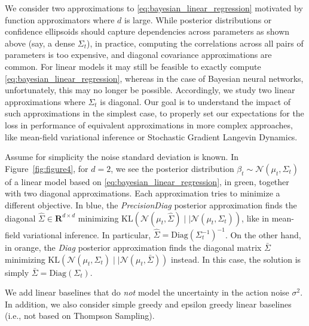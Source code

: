 \documentclass{article} \usepackage{iclr2018_conference,times}
\begin{document}
We consider two approximations to \eqref{eq:bayesian_linear_regression} motivated by function approximators where $d$ is large. While posterior distributions or confidence ellipsoids should capture dependencies across parameters as shown above (say, a dense $\Sigma_t$), in practice, computing the correlations across all pairs of parameters is too expensive, and diagonal covariance approximations are common.
For linear models it may still be feasible to exactly compute \eqref{eq:bayesian_linear_regression}, whereas in the case of Bayesian neural networks, unfortunately, this may no longer be possible.
Accordingly, we study two linear approximations where $\Sigma_t$ is diagonal. 
Our goal is to understand the impact of such approximations in the simplest case, to properly set our expectations for the loss in performance of equivalent approximations in more complex approaches, like mean-field variational inference or Stochastic Gradient Langevin Dynamics.

Assume for simplicity the noise standard deviation is known.
In Figure~\ref{fig:figure4}, for $d=2$, we see the posterior distribution $\beta_t \sim \mathcal{N}(\mu_t, \Sigma_t)$ of a linear model based on \eqref{eq:bayesian_linear_regression}, in green, together with two diagonal approximations.
Each approximation tries to minimize a different objective.
In blue, the \emph{PrecisionDiag} posterior approximation finds the diagonal $\hat{\Sigma} \in \mathbf{R}^{d \times d}$ minimizing $\text{KL}(\mathcal{N}(\mu_t, \hat{\Sigma}) \mid \mid \mathcal{N}(\mu_t, \Sigma_t))$, like in mean-field variational inference. In particular, $\hat{\Sigma} = \text{Diag}(\Sigma_t^{-1})^{-1}$.
On the other hand, in orange, the \emph{Diag} posterior approximation finds the diagonal matrix $\bar{\Sigma}$ minimizing $\text{KL}(\mathcal{N}(\mu_t, \Sigma_t) \mid \mid \mathcal{N}(\mu_t, \bar{\Sigma}))$ instead.
In this case, the solution is simply $\bar{\Sigma} = \text{Diag}(\Sigma_t)$.

We add linear baselines that do \emph{not} model the uncertainty in the action noise $\sigma^2$.
In addition, we also consider simple greedy and epsilon greedy linear baselines (i.e., not based on Thompson Sampling).
\end{document}
